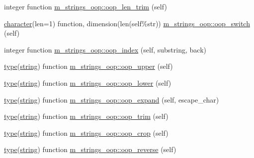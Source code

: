 \begin{DoxyCompactItemize}
\item 
integer function \hyperlink{namespacem__strings__oop_a1b9bf3c6aac71ce1782fb3116ffb63f8}{m\+\_\+strings\+\_\+oop\+::oop\+\_\+len\+\_\+trim} (self)
\item 
\hyperlink{option__stopwatch_83_8txt_abd4b21fbbd175834027b5224bfe97e66}{character}(len=1) function, dimension(len(self\%str)) \hyperlink{namespacem__strings__oop_a31be80e67fa4829b5ac48c530bd58b7b}{m\+\_\+strings\+\_\+oop\+::oop\+\_\+switch} (self)
\item 
integer function \hyperlink{namespacem__strings__oop_aafe02b26ccba21eb8a35e9fa99d6c790}{m\+\_\+strings\+\_\+oop\+::oop\+\_\+index} (self, substring, back)
\item 
\hyperlink{stop__watch_83_8txt_a70f0ead91c32e25323c03265aa302c1c}{type}(\hyperlink{what__overview_81_8txt_a74cb7e955273b9f9157b4f0c18a38849}{string}) function \hyperlink{namespacem__strings__oop_a9f4030a1ab2c7e2aa71b9d1f2754e67e}{m\+\_\+strings\+\_\+oop\+::oop\+\_\+upper} (self)
\item 
\hyperlink{stop__watch_83_8txt_a70f0ead91c32e25323c03265aa302c1c}{type}(\hyperlink{what__overview_81_8txt_a74cb7e955273b9f9157b4f0c18a38849}{string}) function \hyperlink{namespacem__strings__oop_ad49fed83544ede7b94948dee326ca3d7}{m\+\_\+strings\+\_\+oop\+::oop\+\_\+lower} (self)
\item 
\hyperlink{stop__watch_83_8txt_a70f0ead91c32e25323c03265aa302c1c}{type}(\hyperlink{what__overview_81_8txt_a74cb7e955273b9f9157b4f0c18a38849}{string}) function \hyperlink{namespacem__strings__oop_a5b96d2a6f242a096cd5788cf0802e825}{m\+\_\+strings\+\_\+oop\+::oop\+\_\+expand} (self, escape\+\_\+char)
\item 
\hyperlink{stop__watch_83_8txt_a70f0ead91c32e25323c03265aa302c1c}{type}(\hyperlink{what__overview_81_8txt_a74cb7e955273b9f9157b4f0c18a38849}{string}) function \hyperlink{namespacem__strings__oop_ab9238801d6c3af2fe7ee81c8d2c514ff}{m\+\_\+strings\+\_\+oop\+::oop\+\_\+trim} (self)
\item 
\hyperlink{stop__watch_83_8txt_a70f0ead91c32e25323c03265aa302c1c}{type}(\hyperlink{what__overview_81_8txt_a74cb7e955273b9f9157b4f0c18a38849}{string}) function \hyperlink{namespacem__strings__oop_aa1a395d359592720a842054fd0aaff0a}{m\+\_\+strings\+\_\+oop\+::oop\+\_\+crop} (self)
\item 
\hyperlink{stop__watch_83_8txt_a70f0ead91c32e25323c03265aa302c1c}{type}(\hyperlink{what__overview_81_8txt_a74cb7e955273b9f9157b4f0c18a38849}{string}) function \hyperlink{namespacem__strings__oop_ac3ab62e14d0b8445f51e084b810e2f76}{m\+\_\+strings\+\_\+oop\+::oop\+\_\+reverse} (self)

\end{DoxyCompactItemize}
